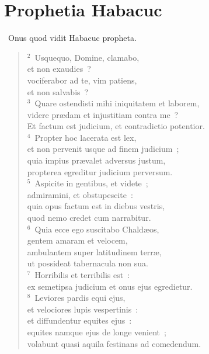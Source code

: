 {\centering \section*{Prophetia Habacuc}}\thispagestyle{empty}

~Onus quod vidit Habacuc propheta.


\begin{flushleft}\begin{verse}\vspace{6pt}${}^{2}$~Usquequo, Domine, clamabo,\\ et non exaudies~?\\ vociferabor ad te, vim patiens,\\ et non salvabis~?\\
${}^{3}$~Quare ostendisti mihi iniquitatem et laborem,\\ videre pr\ae dam et injustitiam contra me~?\\ Et factum est judicium, et contradictio potentior.\\
${}^{4}$~Propter hoc lacerata est lex,\\ et non pervenit usque ad finem judicium~;\\ quia impius pr\ae valet adversus justum,\\ propterea egreditur judicium perversum.\\
${}^{5}$~Aspicite in gentibus, et videte~;\\ admiramini, et obstupescite~:\\ quia opus factum est in diebus vestris,\\ quod nemo credet cum narrabitur.\\
${}^{6}$~Quia ecce ego suscitabo Chald\ae os,\\ gentem amaram et velocem,\\ ambulantem super latitudinem terr\ae ,\\ ut possideat tabernacula non sua.\\
${}^{7}$~Horribilis et terribilis est~:\\ ex semetipsa judicium et onus ejus egredietur.\\
${}^{8}$~Leviores pardis equi ejus,\\ et velociores lupis vespertinis~:\\ et diffundentur equites ejus~:\\ equites namque ejus de longe venient~;\\ volabunt quasi aquila festinans ad comedendum.\\

\end{verse}
\end{flushleft}

